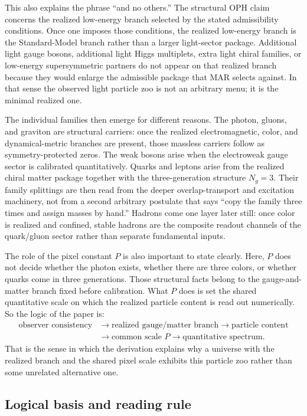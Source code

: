 \documentclass[11pt]{article}
\begin{document}
This also explains the phrase ``and no others.'' The structural OPH claim concerns the realized
low-energy branch selected by the stated admissibility conditions. Once one imposes those
conditions, the realized low-energy branch is the
Standard-Model branch rather than a larger light-sector package. Additional light gauge bosons,
additional light Higgs multiplets, extra light chiral families, or low-energy supersymmetric
partners do not appear on that realized branch because they would enlarge the admissible package
that MAR selects against. In that sense the observed light particle zoo is not an arbitrary menu;
it is the minimal realized one.

The individual families then emerge for different reasons. The photon, gluons, and graviton are
structural carriers: once the realized electromagnetic, color, and dynamical-metric branches are
present, those massless carriers follow as symmetry-protected zeros. The weak bosons arise when
the electroweak gauge sector is calibrated quantitatively. Quarks and leptons arise from the
realized chiral matter package together with the three-generation structure \(N_g=3\). Their
family splittings are then read from the deeper overlap-transport and excitation machinery, not
from a second arbitrary postulate that says ``copy the family three times and assign masses by
hand.'' Hadrons come one layer later still: once color is realized and confined, stable hadrons
are the composite readout channels of the quark/gluon sector rather than separate fundamental
inputs.

The role of the pixel constant \(P\) is also important to state clearly. Here, \(P\) does not
decide whether the photon exists, whether there are three colors, or whether quarks come in three
generations. Those structural facts belong to the gauge-and-matter branch fixed before
calibration. What \(P\) does is set the shared quantitative scale on which the realized particle
content is read out numerically. So the logic of the paper is:
\[
\begin{aligned}
\text{observer consistency}
&\to
\text{realized gauge/matter branch}
\to
\text{particle content} \\
&\to
\text{common scale }P
\to
\text{quantitative spectrum}.
\end{aligned}
\]
That is the sense in which the derivation explains why a universe with the realized branch and the
shared pixel scale exhibits this particle zoo rather than some unrelated alternative one.

\subsection{Logical basis and reading rule}
\end{document}
